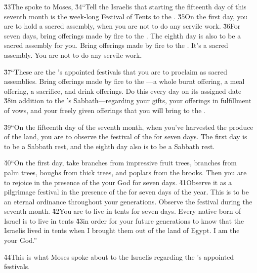 \v{33}The  spoke to Moses, \v{34}``Tell the Israelis that starting the fifteenth day of this seventh month is the week-long Festival of Tents to the . \v{35}On the first day, you are to hold a sacred assembly, when you are not to do any servile work. \v{36}For seven days, bring offerings made by fire to the . The eighth day is also to be a sacred assembly for you. Bring offerings made by fire to the . It's a sacred assembly. You are not to do any servile work.

\v{37}``These are the 's appointed festivals that you are to proclaim as sacred assemblies. Bring offerings made by fire to the ---a whole burnt offering, a meal offering, a sacrifice, and drink offerings. Do this every day on its assigned date \v{38}in addition to the 's Sabbath---regarding your gifts, your offerings in fulfillment of vows, and your freely given offerings that you will bring to the .

\v{39}``On the fifteenth day of the seventh month, when you've harvested the produce of the land, you are to observe the festival of the  for seven days. The first day is to be a Sabbath rest, and the eighth day also is to be a Sabbath rest.

\v{40}``On the first day, take branches from impressive fruit trees, branches from palm trees, boughs from thick trees, and poplars from the brooks. Then you are to rejoice in the presence of the  your God for seven days. \v{41}Observe it as a pilgrimage festival in the presence of the  for seven days of the year. This is to be an eternal ordinance throughout your generations. Observe the festival during the seventh month. \v{42}You are to live in tents for seven days. Every native born of Israel is to live in tents \v{43}in order for your future generations to know that the Israelis lived in tents when I brought them out of the land of Egypt. I am the  your God.''

\v{44}This is what Moses spoke about to the Israelis regarding the 's appointed festivals.

